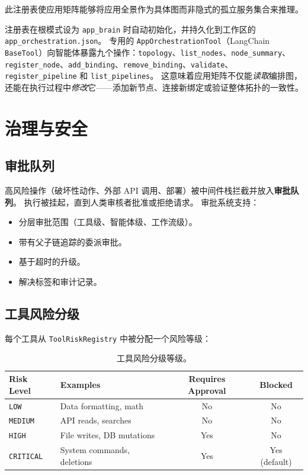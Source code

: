 \documentclass[11pt,a4paper]{article}
\begin{document}
此注册表使应用矩阵能够将应用全景作为具体图而非隐式的孤立服务集合来推理。

注册表在根模式设为 \texttt{app\_brain} 时自动初始化，并持久化到工作区的 \texttt{app\_orchestration.json}。
专用的 \texttt{AppOrchestrationTool}（LangChain \texttt{BaseTool}）向智能体暴露九个操作：\texttt{topology}、\texttt{list\_nodes}、\texttt{node\_summary}、\texttt{register\_node}、\texttt{add\_binding}、\texttt{remove\_binding}、\texttt{validate}、\texttt{register\_pipeline} 和 \texttt{list\_pipelines}。
这意味着应用矩阵不仅能\emph{读取}编排图，还能在执行过程中\emph{修改}它——添加新节点、连接新绑定或验证整体拓扑的一致性。


\section{治理与安全}
\label{sec:governance}

\subsection{审批队列}

高风险操作（破坏性动作、外部 API 调用、部署）被中间件栈拦截并放入\textbf{审批队列}。
执行被挂起，直到人类审核者批准或拒绝请求。
审批系统支持：
\begin{itemize}
  \item 分层审批范围（工具级、智能体级、工作流级）。
  \item 带有父子链追踪的委派审批。
  \item 基于超时的升级。
  \item 解决标签和审计记录。
\end{itemize}

\subsection{工具风险分级}

每个工具从 \texttt{ToolRiskRegistry} 中被分配一个风险等级：

\begin{table}[h]
\centering
\small
\begin{tabular}{llcc}
\toprule
\textbf{Risk Level} & \textbf{Examples} & \textbf{Requires Approval} & \textbf{Blocked} \\
\midrule
\texttt{LOW} & Data formatting, math & No & No \\
\texttt{MEDIUM} & API reads, searches & No & No \\
\texttt{HIGH} & File writes, DB mutations & Yes & No \\
\texttt{CRITICAL} & System commands, deletions & Yes & Yes (default) \\
\bottomrule
\end{tabular}
\caption{工具风险分级等级。}
\label{tab:risk}
\end{table}
\end{document}
